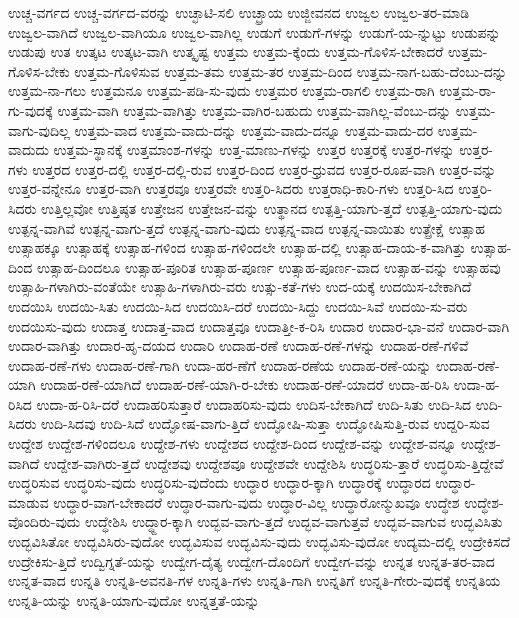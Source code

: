 {ಉಚ್ಚ-ವರ್ಗದ
ಉಚ್ಚ-ವರ್ಗದ-ವರನ್ನು
ಉಚ್ಛಾಟಿ-ಸಲಿ
ಉಚ್ಛ್ರಾಯ
ಉಜ್ಜೀವನದ
ಉಜ್ವಲ
ಉಜ್ವಲ-ತರ-ಮಾಡಿ
ಉಜ್ವಲ-ವಾಗಿದೆ
ಉಜ್ವಲ-ವಾಗಿಯೂ
ಉಜ್ವಲ-ವಾಗಿಲ್ಲ
ಉಡುಗೆ
ಉಡುಗೆ-ಗಳನ್ನು
ಉಡುಗೆ-ಯ-ನ್ನುಟ್ಟು
ಉಡುಪನ್ನು
ಉಡುಪು
ಉತ
ಉತ್ಕಟ
ಉತ್ಕಟ-ವಾಗಿ
ಉತ್ಕೃಷ್ಟ
ಉತ್ತಮ
ಉತ್ತಮ-ಕ್ಕೆಂದು
ಉತ್ತಮ-ಗೊಳಿಸ-ಬೇಕಾದರೆ
ಉತ್ತಮ-ಗೊಳಿಸ-ಬೇಕು
ಉತ್ತಮ-ಗೊಳಿಸುವ
ಉತ್ತಮ-ತಮ
ಉತ್ತಮ-ತರ
ಉತ್ತಮ-ದಿಂದ
ಉತ್ತಮ-ನಾಗ-ಬಹು-ದೆಂಬು-ದನ್ನು
ಉತ್ತಮ-ನಾ-ಗಲು
ಉತ್ತಮನೂ
ಉತ್ತಮ-ಪಡಿ-ಸು-ವುದು
ಉತ್ತಮರ
ಉತ್ತಮ-ರಾಗಲಿ
ಉತ್ತಮ-ರಾಗಿ
ಉತ್ತಮ-ರಾ-ಗು-ವುದಕ್ಕೆ
ಉತ್ತಮ-ವಾಗಿ
ಉತ್ತಮ-ವಾಗಿತ್ತು
ಉತ್ತಮ-ವಾಗಿರ-ಬಹುದು
ಉತ್ತಮ-ವಾಗಿಲ್ಲ-ವೆಂಬು-ದನ್ನು
ಉತ್ತಮ-ವಾಗು-ವುದಿಲ್ಲ
ಉತ್ತಮ-ವಾದ
ಉತ್ತಮ-ವಾದು-ದನ್ನು
ಉತ್ತಮ-ವಾದು-ದನ್ನೂ
ಉತ್ತಮ-ವಾದು-ದರ
ಉತ್ತಮ-ವಾದುದು
ಉತ್ತಮ-ಸ್ಥಾನಕ್ಕೆ
ಉತ್ತಮಾಂಶ-ಗಳನ್ನು
ಉತ್ತ-ಮಾಣು-ಗಳನ್ನು
ಉತ್ತರ
ಉತ್ತರಕ್ಕೆ
ಉತ್ತರ-ಗಳನ್ನು
ಉತ್ತರ-ಗಳು
ಉತ್ತರದ
ಉತ್ತರ-ದಲ್ಲಿ
ಉತ್ತರ-ದಲ್ಲಿ-ರುವ
ಉತ್ತರ-ದಿಂದ
ಉತ್ತರ-ಧ್ರುವದ
ಉತ್ತರ-ರೂಪ-ವಾಗಿ
ಉತ್ತರ-ವನ್ನು
ಉತ್ತರ-ವನ್ನೇನೂ
ಉತ್ತರ-ವಾಗಿ
ಉತ್ತರವೂ
ಉತ್ತರವೇ
ಉತ್ತರಿ-ಸಿದರು
ಉತ್ತರಾಧಿ-ಕಾರಿ-ಗಳು
ಉತ್ತರಿ-ಸಿದ
ಉತ್ತರಿ-ಸಿದರು
ಉತ್ತಿಲ್ಲವೋ
ಉತ್ತಿಷ್ಠತ
ಉತ್ತೇಜನ
ಉತ್ತೇಜನ-ವನ್ನು
ಉತ್ಥಾನದ
ಉತ್ಪತ್ತಿ-ಯಾಗು-ತ್ತದೆ
ಉತ್ಪತ್ತಿ-ಯಾಗು-ವುದು
ಉತ್ಪನ್ನ-ವಾಗಿವೆ
ಉತ್ಪನ್ನ-ವಾಗು-ತ್ತದೆ
ಉತ್ಪನ್ನ-ವಾಗು-ವುದು
ಉತ್ಪನ್ನ-ವಾದ
ಉತ್ಪನ್ನ-ವಾಯಿತು
ಉತ್ಪ್ರೇಕ್ಷೆ
ಉತ್ಸಾಹ
ಉತ್ಸಾಹಕ್ಕೂ
ಉತ್ಸಾಹಕ್ಕೆ
ಉತ್ಸಾಹ-ಗಳಿಂದ
ಉತ್ಸಾಹ-ಗಳಿಂದಲೇ
ಉತ್ಸಾಹ-ದಲ್ಲಿ
ಉತ್ಸಾಹ-ದಾಯ-ಕ-ವಾಗಿತ್ತು
ಉತ್ಸಾಹ-ದಿಂದ
ಉತ್ಸಾಹ-ದಿಂದಲೂ
ಉತ್ಸಾಹ-ಪೂರಿತ
ಉತ್ಸಾಹ-ಪೂರ್ಣ
ಉತ್ಸಾಹ-ಪೂರ್ಣ-ವಾದ
ಉತ್ಸಾಹ-ವನ್ನು
ಉತ್ಸಾಹವು
ಉತ್ಸಾಹಿ-ಗಳಾಗಿರು-ವಂತೆಯೇ
ಉತ್ಸಾಹಿ-ಗಳಾಗಿರು-ವರು
ಉತ್ಸು-ಕತೆ-ಗಳು
ಉದ-ಯಕ್ಕೆ
ಉದಯಿಸ-ಬೇಕಾಗಿದೆ
ಉದಯಿಸಿ
ಉದಯಿ-ಸಿತು
ಉದಯಿ-ಸಿದ
ಉದಯಿಸಿ-ದರೆ
ಉದಯಿ-ಸಿದ್ದು
ಉದಯಿ-ಸಿವೆ
ಉದಯಿ-ಸು-ವರು
ಉದಯಿಸು-ವುದು
ಉದಾತ್ತ
ಉದಾತ್ತ-ವಾದ
ಉದಾತ್ತವೂ
ಉದಾತ್ತೀ-ಕ-ರಿಸಿ
ಉದಾರ
ಉದಾರ-ಭಾ-ವನೆ
ಉದಾರ-ವಾಗಿ
ಉದಾರ-ವಾಗಿತ್ತು
ಉದಾರ-ಹೃ-ದಯದ
ಉದಾರಿ
ಉದಾಹ-ರಣೆ
ಉದಾಹ-ರಣೆ-ಗಳನ್ನು
ಉದಾಹ-ರಣೆ-ಗಳಿವೆ
ಉದಾಹ-ರಣೆ-ಗಳು
ಉದಾಹ-ರಣೆ-ಗಾಗಿ
ಉದಾ-ಹರ-ಣೆಗೆ
ಉದಾಹ-ರಣೆಯ
ಉದಾಹ-ರಣೆ-ಯನ್ನು
ಉದಾಹ-ರಣೆ-ಯಾಗಿ
ಉದಾಹ-ರಣೆ-ಯಾಗಿದೆ
ಉದಾಹ-ರಣೆ-ಯಾಗಿ-ರ-ಬೇಕು
ಉದಾಹ-ರಣೆ-ಯಾದರೆ
ಉದಾ-ಹ-ರಿಸಿ
ಉದಾ-ಹ-ರಿಸಿದ
ಉದಾ-ಹ-ರಿಸಿ-ದರೆ
ಉದಾಹರಿಸುತ್ತಾರೆ
ಉದಾಹರಿಸು-ವುದು
ಉದಿಸ-ಬೇಕಾಗಿದೆ
ಉದಿ-ಸಿತು
ಉದಿ-ಸಿದ
ಉದಿ-ಸಿದರು
ಉದಿ-ಸಿದವು
ಉದಿ-ಸಿದೆ
ಉದ್ಘೋಷ-ವಾಗು-ತ್ತಿದೆ
ಉದ್ಘೋಷಿ-ಸುತ್ತಾ
ಉದ್ಘೋಷಿಸುತ್ತಿ-ರುವ
ಉದ್ದರಿ-ಸುವ
ಉದ್ದೇಶ
ಉದ್ದೇಶ-ಗಳಿಂದಲೂ
ಉದ್ದೇಶ-ಗಳು
ಉದ್ದೇಶದ
ಉದ್ದೇಶ-ದಿಂದ
ಉದ್ದೇಶ-ವನ್ನು
ಉದ್ದೇಶ-ವನ್ನೂ
ಉದ್ದೇಶ-ವಾಗಿದೆ
ಉದ್ದೇಶ-ವಾಗಿರು-ತ್ತದೆ
ಉದ್ದೇಶವು
ಉದ್ದೇಶವೂ
ಉದ್ದೇಶವೇ
ಉದ್ದೇಶಿಸಿ
ಉದ್ಧರಿಸು-ತ್ತಾರೆ
ಉದ್ಧರಿಸು-ತ್ತಿದ್ದೇವೆ
ಉದ್ಧರಿಸುವ
ಉದ್ಧರಿಸು-ವುದು
ಉದ್ಧರಿಸು-ವುದೆಂದು
ಉದ್ಧಾರ
ಉದ್ಧಾರ-ಕ್ಕಾಗಿ
ಉದ್ಧಾರಕ್ಕೆ
ಉದ್ಧಾರದ
ಉದ್ಧಾರ-ಮಾಡುವ
ಉದ್ಧಾರ-ವಾಗ-ಬೇಕಾದರೆ
ಉದ್ಧಾರ-ವಾಗು-ವುದು
ಉದ್ಧಾರ-ವಿಲ್ಲ
ಉದ್ಧಾರೋನ್ಮುಖವೂ
ಉದ್ಧೇಶ
ಉದ್ಧೇಶ-ವೊಂದಿರು-ವುದು
ಉದ್ಧೇಶಿಸಿ
ಉದ್ಧ್ದಾರ-ಕ್ಕಾಗಿ
ಉದ್ಭವ-ವಾಗು-ತ್ತದೆ
ಉದ್ಭವ-ವಾಗುತ್ತವೆ
ಉದ್ಭವ-ವಾಗುವ
ಉದ್ಭವಿಸಿತು
ಉದ್ಭವಿಸಿತೋ
ಉದ್ಭವಿಸಿರು-ವುದೋ
ಉದ್ಭವಿಸುವ
ಉದ್ಭವಿಸು-ವುದು
ಉದ್ಭವಿಸು-ವುದೋ
ಉದ್ಯಮ-ದಲ್ಲಿ
ಉದ್ರೇಕಿಸದೆ
ಉದ್ರೇಕಿಸು-ತ್ತಿದೆ
ಉದ್ವಿಗ್ನತೆ-ಯನ್ನು
ಉದ್ವೇಗ-ದೈತ್ಯ
ಉದ್ವೇಗ-ದೊಂದಿಗೆ
ಉದ್ವೇಗ-ವನ್ನು
ಉನ್ನತ
ಉನ್ನತ-ತರ-ವಾದ
ಉನ್ನತ-ವಾದ
ಉನ್ನತಿ
ಉನ್ನತಿ-ಅವನತಿ-ಗಳ
ಉನ್ನತಿ-ಗಳು
ಉನ್ನತಿ-ಗಾಗಿ
ಉನ್ನತಿಗೆ
ಉನ್ನತಿ-ಗೇರು-ವುದಕ್ಕೆ
ಉನ್ನತಿಯ
ಉನ್ನತಿ-ಯನ್ನು
ಉನ್ನತಿ-ಯಾಗು-ವುದೋ
ಉನ್ನತ್ತತೆ-ಯನ್ನು
}
